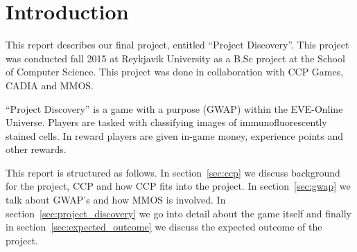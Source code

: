\section{Introduction}\label{sec:introduction}
This report describes our final project, entitled ``Project Discovery''. This
project was conducted fall 2015 at Reykjavik University as a B.Sc project at
the School of Computer Science. This project was done in collaboration with CCP
Games, CADIA and MMOS.

``Project Discovery'' is a game with a purpose (GWAP) within the EVE-Online
Universe. Players are tasked with classifying images of immunofluorescently
stained cells. In reward players are given in-game money, experience points and
other rewards.

This report is structured as follows. In section~\ref{sec:ccp} we discuss background 
for the project, CCP and how CCP fits into the project. In section~\ref{sec:gwap} we talk about GWAP's and how MMOS is involved. In section~\ref{sec:project_discovery} we go into detail about the game itself and finally in section~\ref{sec:expected_outcome} we discuss the expected outcome of the project.


